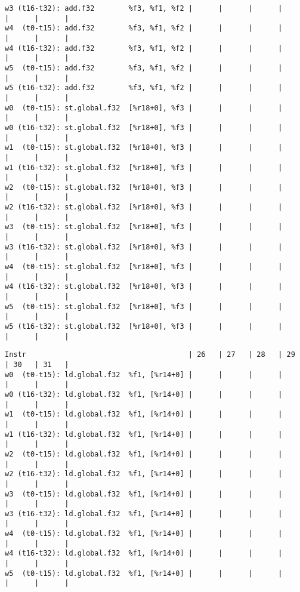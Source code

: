 \documentclass[11pt]{article}
\begin{document}
\begin{Answer}
\begin{verbatim}
w3 (t16-t32): add.f32        %f3, %f1, %f2 |      |      |      |      |      |      |
w4  (t0-t15): add.f32        %f3, %f1, %f2 |      |      |      |      |      |      |
w4 (t16-t32): add.f32        %f3, %f1, %f2 |      |      |      |      |      |      |
w5  (t0-t15): add.f32        %f3, %f1, %f2 |      |      |      |      |      |      |
w5 (t16-t32): add.f32        %f3, %f1, %f2 |      |      |      |      |      |      |
w0  (t0-t15): st.global.f32  [%r18+0], %f3 |      |      |      |      |      |      |
w0 (t16-t32): st.global.f32  [%r18+0], %f3 |      |      |      |      |      |      |
w1  (t0-t15): st.global.f32  [%r18+0], %f3 |      |      |      |      |      |      |
w1 (t16-t32): st.global.f32  [%r18+0], %f3 |      |      |      |      |      |      |
w2  (t0-t15): st.global.f32  [%r18+0], %f3 |      |      |      |      |      |      |
w2 (t16-t32): st.global.f32  [%r18+0], %f3 |      |      |      |      |      |      |
w3  (t0-t15): st.global.f32  [%r18+0], %f3 |      |      |      |      |      |      |
w3 (t16-t32): st.global.f32  [%r18+0], %f3 |      |      |      |      |      |      |
w4  (t0-t15): st.global.f32  [%r18+0], %f3 |      |      |      |      |      |      |
w4 (t16-t32): st.global.f32  [%r18+0], %f3 |      |      |      |      |      |      |
w5  (t0-t15): st.global.f32  [%r18+0], %f3 |      |      |      |      |      |      |
w5 (t16-t32): st.global.f32  [%r18+0], %f3 |      |      |      |      |      |      |
\end{verbatim}
	\newpage
	\begin{verbatim}
Instr                                      | 26   | 27   | 28   | 29   | 30   | 31   |
w0  (t0-t15): ld.global.f32  %f1, [%r14+0] |      |      |      |      |      |      |
w0 (t16-t32): ld.global.f32  %f1, [%r14+0] |      |      |      |      |      |      |
w1  (t0-t15): ld.global.f32  %f1, [%r14+0] |      |      |      |      |      |      |
w1 (t16-t32): ld.global.f32  %f1, [%r14+0] |      |      |      |      |      |      |
w2  (t0-t15): ld.global.f32  %f1, [%r14+0] |      |      |      |      |      |      |
w2 (t16-t32): ld.global.f32  %f1, [%r14+0] |      |      |      |      |      |      |
w3  (t0-t15): ld.global.f32  %f1, [%r14+0] |      |      |      |      |      |      |
w3 (t16-t32): ld.global.f32  %f1, [%r14+0] |      |      |      |      |      |      |
w4  (t0-t15): ld.global.f32  %f1, [%r14+0] |      |      |      |      |      |      |
w4 (t16-t32): ld.global.f32  %f1, [%r14+0] |      |      |      |      |      |      |
w5  (t0-t15): ld.global.f32  %f1, [%r14+0] |      |      |      |      |      |      |

\end{verbatim}
\end{Answer}
\end{document}
